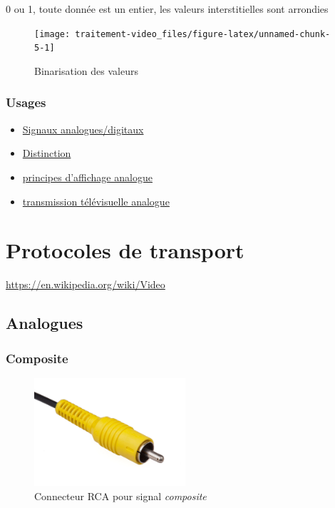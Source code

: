 \documentclass[
  french,
]{book}
\providecommand{\tightlist}{%
  \setlength{\itemsep}{0pt}\setlength{\parskip}{0pt}}
\begin{document}
0 ou 1, toute donnée est un entier, les valeurs interstitielles sont arrondies

\begin{figure}

{\centering \texttt{[image: traitement-video\_files/figure-latex/unnamed-chunk-5-1]} 

}

\caption{Binarisation des valeurs}\label{fig:unnamed-chunk-5}
\end{figure}

\hypertarget{usages}{%
\subsubsection{Usages}\label{usages}}

\begin{itemize}
\tightlist
\item
  \href{https://en.wikipedia.org/wiki/Video\#Analog_video}{Signaux analogues/digitaux}
\item
  \href{http://what-when-how.com/display-interfaces/basics-of-analog-and-digital-display-interfaces-part-1/}{Distinction}
\item
  \href{http://what-when-how.com/display-interfaces/basic-concepts-in-display-systems-part-1/}{principes d'affichage analogue}
\item
  \href{https://en.wikipedia.org/wiki/Analog_television}{transmission télévisuelle analogue}
\end{itemize}

\hypertarget{protocoles-de-transport}{%
\section{Protocoles de transport}\label{protocoles-de-transport}}

\url{https://en.wikipedia.org/wiki/Video}

\hypertarget{analogues}{%
\subsection{Analogues}\label{analogues}}

\hypertarget{composite}{%
\subsubsection{Composite}\label{composite}}

\begin{figure}
\centering
\includegraphics[width=0.5\textwidth,height=\textheight]{medias/lexique/signaux/analogue/composite.jpg}
\caption{Connecteur RCA pour signal \emph{composite}}
\end{figure}
\end{document}
